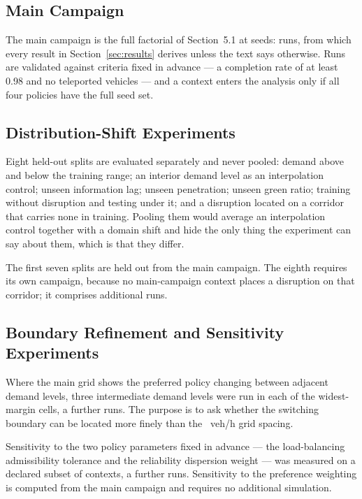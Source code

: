\subsection{Main Campaign}

The main campaign is the full factorial of Section~5.1 at \NumSeeds{} seeds:
\NumRunsMain{} runs, from which every result in Section~\ref{sec:results}
derives unless the text says otherwise. Runs are validated against criteria
fixed in advance --- a completion rate of at least 0.98 and no teleported
vehicles --- and a context enters the analysis only if all four policies have
the full seed set.

\subsection{Distribution-Shift Experiments}

Eight held-out splits are evaluated separately and never pooled: demand above
and below the training range; an interior demand level as an interpolation
control; unseen information lag; unseen penetration; unseen green ratio;
training without disruption and testing under it; and a disruption located on a
corridor that carries none in training. Pooling them would average an
interpolation control together with a domain shift and hide the only thing the
experiment can say about them, which is that they differ.

The first seven splits are held out from the main campaign. The eighth requires
its own campaign, because no main-campaign context places a disruption on that
corridor; it comprises \NumRunsOODNorth{} additional runs.

\subsection{Boundary Refinement and Sensitivity Experiments}

Where the main grid shows the preferred policy changing between adjacent demand
levels, three intermediate demand levels were run in each of the \NumBoundN{}
widest-margin cells, a further \NumRunsBoundary{} runs. The purpose is to ask
whether the switching boundary can be located more finely than the
\NumBoundGrid~veh/h grid spacing.

Sensitivity to the two policy parameters fixed in advance --- the
load-balancing admissibility tolerance and the reliability dispersion weight ---
was measured on a declared subset of contexts, a further \NumRunsSens{} runs.
Sensitivity to the preference weighting is computed from the main campaign and
requires no additional simulation.

